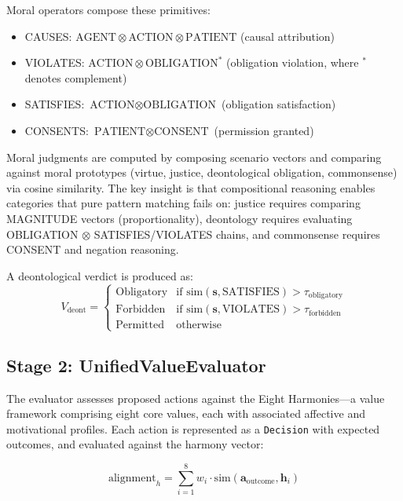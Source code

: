 \documentclass[11pt,a4paper]{article}
\begin{document}
Moral operators compose these primitives:
\begin{itemize}
  \item CAUSES: $\text{AGENT} \otimes \text{ACTION} \otimes \text{PATIENT}$ (causal attribution)
  \item VIOLATES: $\text{ACTION} \otimes \text{OBLIGATION}^*$ (obligation violation, where ${}^*$ denotes complement)
  \item SATISFIES: $\text{ACTION} \otimes \text{OBLIGATION}$ (obligation satisfaction)
  \item CONSENTS: $\text{PATIENT} \otimes \text{CONSENT}$ (permission granted)
\end{itemize}

Moral judgments are computed by composing scenario vectors and comparing against moral prototypes (virtue, justice, deontological obligation, commonsense) via cosine similarity. The key insight is that compositional reasoning enables categories that pure pattern matching fails on: justice requires comparing MAGNITUDE vectors (proportionality), deontology requires evaluating OBLIGATION $\otimes$ SATISFIES/VIOLATES chains, and commonsense requires CONSENT and negation reasoning.

A deontological verdict is produced as:
\begin{equation}
V_{\text{deont}} = \begin{cases}
\text{Obligatory} & \text{if } \text{sim}(\mathbf{s}, \text{SATISFIES}) > \tau_{\text{obligatory}} \\
\text{Forbidden} & \text{if } \text{sim}(\mathbf{s}, \text{VIOLATES}) > \tau_{\text{forbidden}} \\
\text{Permitted} & \text{otherwise}
\end{cases}
\end{equation}

\subsection{Stage 2: UnifiedValueEvaluator}

The evaluator assesses proposed actions against the Eight Harmonies---a value framework comprising eight core values, each with associated affective and motivational profiles. Each action is represented as a \texttt{Decision} with expected outcomes, and evaluated against the harmony vector:

\begin{equation}
\text{alignment}_h = \sum_{i=1}^{8} w_i \cdot \text{sim}(\mathbf{a}_{\text{outcome}}, \mathbf{h}_i)
\end{equation}
\end{document}

